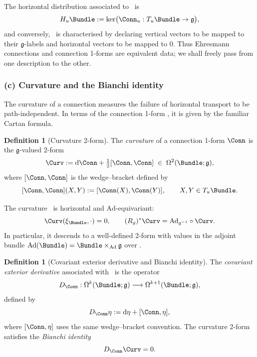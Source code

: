 \documentclass[11pt]{book}
\theoremstyle{plain}
\theoremstyle{definition}
\newtheorem{definition}[theorem]{Definition} \theoremstyle{remark}
\begin{document}
The horizontal distribution associated to \Conn\ is
\[
   H_u\Bundle
   := \ker\bigl(\Conn_u:T_u\Bundle\to\mathfrak{g}\bigr),
\]
and conversely, \Conn\ is characterised by declaring vertical vectors
to be mapped to their $\mathfrak{g}$-labels and horizontal vectors to
be mapped to $0$. Thus Ehresmann connections and connection 1-forms
are equivalent data; we shall freely pass from one description to the
other.



\subsubsection*{(c) Curvature and the Bianchi identity}

The curvature of a connection measures the failure of horizontal transport to be \\
path-independent. In terms of the connection 1-form
\Conn, it is given by the familiar Cartan formula.



\begin{definition}[Curvature 2-form]
The \emph{curvature} of a connection 1-form $\Conn$ is the
  $\mathfrak{g}$-valued 2-form
  \[
     \Curv
     :=
     \mathrm{d}\Conn
     + \tfrac12[\Conn,\Conn]
     \;\in\;
     \Omega^2(\Bundle;\mathfrak{g}),
  \]
  where $[\Conn,\Conn]$ is the wedge–bracket defined by
  \[
     [\Conn,\Conn](X,Y)
     :=
     [\Conn(X),\Conn(Y)],
     \qquad X,Y\in T_u\Bundle.
  \]
\end{definition}

The curvature \Curv\ is horizontal and $\mathrm{Ad}$-equivariant:
\[
   \Curv(\xi_\Bundle,\cdot)=0,
   \qquad
   (R_g)^*\Curv
   = \mathrm{Ad}_{g^{-1}}\circ\Curv.
\]
In particular, it descends to a well-defined 2-form with values in the
adjoint bundle $\mathrm{Ad}(\Bundle)=\Bundle\times_{\mathrm{Ad}}\mathfrak{g}$
over \Base.



\begin{definition}[Covariant exterior derivative and Bianchi identity]
The \emph{covariant exterior derivative} associated with \Conn\ is
  the operator
  \[
     D_\Conn:
       \Omega^k(\Bundle;\mathfrak{g})
       \longrightarrow
       \Omega^{k+1}(\Bundle;\mathfrak{g}),
  \]
  defined by
  \[
     D_\Conn\eta
     :=
     \mathrm{d}\eta
     + [\Conn,\eta],
  \]
  where $[\Conn,\eta]$ uses the same wedge–bracket convention. The
  curvature 2-form satisfies the \emph{Bianchi identity}
  \[
     D_\Conn\Curv = 0.
  \]
\end{definition}
\end{document}
